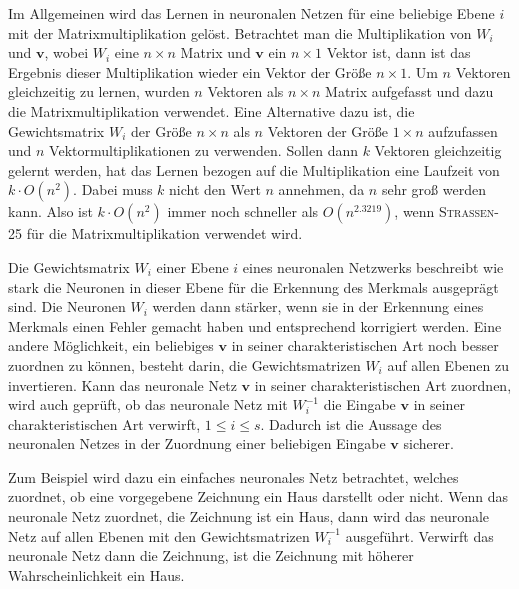 \documentclass{report}
\numberwithin{equation}{section}
\begin{document}
Im Allgemeinen wird das Lernen in neuronalen Netzen für eine beliebige Ebene $i$ mit der Matrixmultiplikation gelöst. Betrachtet man die Multiplikation von $W_i$ und $\boldsymbol{v}$, wobei $W_i$ eine $n \times n$ Matrix und $\boldsymbol{v}$ ein $n \times 1$ Vektor ist, dann ist das Ergebnis dieser Multiplikation wieder ein Vektor der Größe $n \times 1$. Um $n$ Vektoren gleichzeitig zu lernen, wurden $n$ Vektoren als $n \times n$ Matrix aufgefasst und dazu die Matrixmultiplikation verwendet. Eine Alternative dazu ist, die Gewichtsmatrix $W_i$ der Größe $n \times n$ als $n$ Vektoren der Größe $1 \times n$ aufzufassen und $n$ Vektormultiplikationen zu verwenden. Sollen dann $k$ Vektoren gleichzeitig gelernt werden, hat das Lernen bezogen auf die Multiplikation eine Laufzeit von $k \cdot O(n^2)$. Dabei muss $k$ nicht den Wert $n$ annehmen, da $n$ sehr groß werden kann. Also ist $k \cdot O(n^2)$ immer noch schneller als $O(n^{2.3219})$, wenn \textsc{Strassen-25} für die Matrixmultiplikation verwendet wird.

Die Gewichtsmatrix $W_i$ einer Ebene $i$ eines neuronalen Netzwerks beschreibt wie stark die Neuronen in dieser Ebene für die Erkennung des Merkmals ausgeprägt sind. Die Neuronen $W_i$ werden dann stärker, wenn sie in der Erkennung eines Merkmals einen Fehler gemacht haben und entsprechend korrigiert werden. Eine andere Möglichkeit, ein beliebiges $\boldsymbol{v}$ in seiner charakteristischen Art noch besser zuordnen zu können, besteht darin, die Gewichtsmatrizen $W_i$ auf allen Ebenen zu invertieren. Kann das neuronale Netz $\boldsymbol{v}$ in seiner charakteristischen Art zuordnen, wird auch geprüft, ob das neuronale Netz mit $W^{-1}_i$ die Eingabe $\boldsymbol{v}$ in seiner charakteristischen Art verwirft, $1 \leq i \leq s$. Dadurch ist die Aussage des neuronalen Netzes in der Zuordnung einer beliebigen Eingabe $\boldsymbol{v}$ sicherer.

Zum Beispiel wird dazu ein einfaches neuronales Netz betrachtet, welches zuordnet, ob eine vorgegebene Zeichnung ein Haus darstellt oder nicht. Wenn das neuronale Netz zuordnet, die Zeichnung ist ein Haus, dann wird das neuronale Netz auf allen Ebenen mit den Gewichtsmatrizen $W^{-1}_i$ ausgeführt. Verwirft das neuronale Netz dann die Zeichnung, ist die Zeichnung mit höherer Wahrscheinlichkeit ein Haus.
\end{document}
